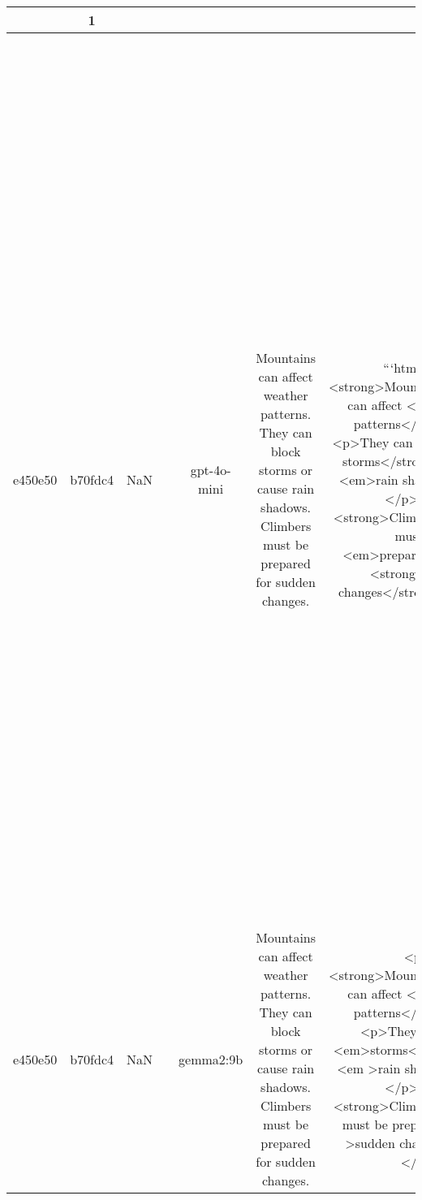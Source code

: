 \begin{table}[h!]
\begin{tabular}{|c|c|c|c|c|c|c|c|c|c|}
{{2. The guideline specifies that inside each `<p>` tag, there should be at least one `<strong>` tag and multiple `<em>` tags to emphasize key words and phrases.

3. There are sentences such as `<p>The recipe calls for two cups of flour.</p>` and `<p>Mix in the wet ingredients until smooth.</p>` that do not contain any `<strong>` or `<em>` tags, which violates the requirement.

Given these observations, the element of adding emphasis with `<strong>` and `<em>` tags is not consistently applied inside each `<p>` tag throughout the output, leading to a non-compliance with the description.

ERR & 1\\
\hline
e450e50 & b70fdc4 & NaN &  & gpt-4o-mini & Mountains can affect weather patterns. They can block storms or cause rain shadows. Climbers must be prepared for sudden changes. & ```html
<p><strong>Mountains</strong> can affect <em>weather patterns</em>.</p>
<p>They can <strong>block storms</strong> or cause <em>rain shadows</em>.</p>
<p><strong>Climbers</strong> must be <em>prepared</em> for <strong>sudden changes</strong>.</p>
``` & ok & The chatbot output is evaluated for compliance against the description provided. Here is the analysis:

1. The output contains three separate `<p>` tags:
   - `<p><strong>Mountains</strong> can affect <em>weather patterns</em>.</p>`
   - `<p>They can <strong>block storms</strong> or cause <em>rain shadows</em>.</p>`
   - `<p><strong>Climbers</strong> must be <em>prepared</em> for <strong>sudden changes</strong>.</p>`
   
   This satisfies the requirement that the output should have at least three `<p>` tags.

2. Each `<p>` tag includes a `<strong>` tag, which aligns with the instruction to add one `<strong>` tag inside each `<p>` tag. 

3. The `<em>` tags are used to emphasize key words and phrases, with at least one `<em>` tag being present inside each `<p>` tag, complying with the requirement to use multiple `<em>` tags.

Based on the above points, the output meets the compliance requirements as specified. No violations of the description are found as the structure and use of tags adhere to the description given.

OK & 1\\
\hline
e450e50 & b70fdc4 & NaN &  & gemma2:9b & Mountains can affect weather patterns. They can block storms or cause rain shadows. Climbers must be prepared for sudden changes. & <p><strong>Mountains</strong> can affect <em>weather patterns</em>.</p>
<p>They can block <em>storms</em> or cause <em >rain shadows</em>.</p>
<p><strong>Climbers</strong> must be prepared for <em >sudden changes</em>.</p>  


}}
\end{tabular}
\end{table}
